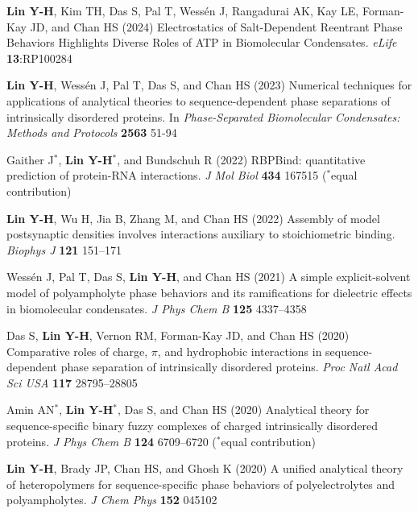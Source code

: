 \documentclass[11pt]{../yhlcv}
\def\tname#1{{\bf #1}}
\begin{document}
\begin{etaremune}[leftmargin=0.26in]

\item
\tname{Lin Y-H}, Kim TH, Das S, Pal T, Wessén J, Rangadurai AK, Kay LE, Forman-Kay JD, and Chan HS (2024)
Electrostatics of Salt-Dependent Reentrant Phase Behaviors Highlights Diverse Roles of ATP in Biomolecular Condensates.
{\it eLife} {\bf 13}:RP100284


\item
\tname{Lin Y-H}, Wessén J, Pal T, Das S, and Chan HS (2023)
Numerical techniques for applications of analytical theories to sequence-dependent phase separations of intrinsically disordered proteins.
In {\it Phase-Separated Biomolecular Condensates: Methods and Protocols} {\bf 2563} 51-94

\item
Gaither J$^*$, \tname{Lin Y-H}$^*$, and Bundschuh R (2022)
RBPBind: quantitative prediction of protein-RNA interactions.
{\it J Mol Biol} {\bf 434} 167515
($^*$equal contribution)

\item 
\tname{Lin Y-H}, Wu H, Jia B, Zhang M, and Chan HS (2022)
Assembly of model postsynaptic densities involves interactions auxiliary to stoichiometric binding.
{\it Biophys J} {\bf 121} 151--171

\item 
Wessén J, Pal T, Das S, \tname{Lin Y-H}, and Chan HS (2021)
A simple explicit-solvent model of polyampholyte phase behaviors and its ramifications for dielectric effects in biomolecular condensates.
{\it J Phys Chem B} {\bf 125} 4337--4358 %

\item 
Das S, \tname{Lin Y-H}, Vernon RM, Forman-Kay JD, and Chan HS (2020)
Comparative roles of charge, $\pi$, and hydrophobic interactions in sequence-dependent phase separation of intrinsically disordered proteins.
{\it Proc Natl Acad Sci USA} {\bf 117} 28795--28805

\item 
Amin AN$^*$, \tname{Lin Y-H}$^*$, Das S, and Chan HS (2020)
Analytical theory for sequence-specific binary fuzzy complexes of charged intrinsically disordered proteins.
{\it J Phys Chem B} 
{\bf 124} 6709--6720
($^*$equal contribution) %

\item
\tname{Lin Y-H}, Brady JP, Chan HS, and Ghosh K (2020)
A unified analytical theory of heteropolymers for sequence-specific phase behaviors of polyelectrolytes and polyampholytes. 
{\it J Chem Phys} {\bf 152} 045102


\end{etaremune}
\end{document}
